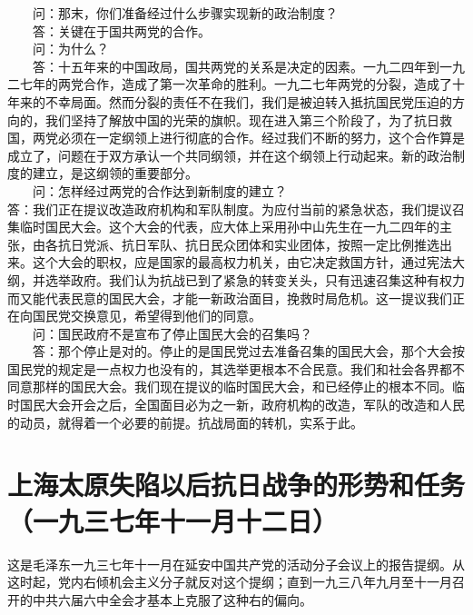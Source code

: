 \documentclass[cn,11pt,chinese]{elegantbook}
\def\myformat#1{\hfil\hfil #1}
\begin{document}
　　问：那末，你们准备经过什么步骤实现新的政治制度？\\
　　答：关键在于国共两党的合作。\\
　　问：为什么？\\
　　答：十五年来的中国政局，国共两党的关系是决定的因素。一九二四年到一九二七年的两党合作，造成了第一次革命的胜利。一九二七年两党的分裂，造成了十年来的不幸局面。然而分裂的责任不在我们，我们是被迫转入抵抗国民党压迫的方向的，我们坚持了解放中国的光荣的旗帜。现在进入第三个阶段了，为了抗日救国，两党必须在一定纲领上进行彻底的合作。经过我们不断的努力，这个合作算是成立了，问题在于双方承认一个共同纲领，并在这个纲领上行动起来。新的政治制度的建立，是这纲领的重要部分。\\
　　问：怎样经过两党的合作达到新制度的建立？\\
答：我们正在提议改造政府机构和军队制度。为应付当前的紧急状态，我们提议召集临时国民大会。这个大会的代表，应大体上采用孙中山先生在一九二四年的主张，由各抗日党派、抗日军队、抗日民众团体和实业团体，按照一定比例推选出来。这个大会的职权，应是国家的最高权力机关，由它决定救国方针，通过宪法大纲，并选举政府。我们认为抗战已到了紧急的转变关头，只有迅速召集这种有权力而又能代表民意的国民大会，才能一新政治面目，挽救时局危机。这一提议我们正在向国民党交换意见，希望得到他们的同意。\\
　　问：国民政府不是宣布了停止国民大会的召集吗？\\
　　答：那个停止是对的。停止的是国民党过去准备召集的国民大会，那个大会按国民党的规定是一点权力也没有的，其选举更根本不合民意。我们和社会各界都不同意那样的国民大会。我们现在提议的临时国民大会，和已经停止的根本不同。临时国民大会开会之后，全国面目必为之一新，政府机构的改造，军队的改造和人民的动员，就得着一个必要的前提。抗战局面的转机，实系于此。\\
\newpage\section*{\myformat{上海太原失陷以后抗日战争的形势和任务}\\\myformat{（一九三七年十一月十二日）}}
\begin{introduction}\item  这是毛泽东一九三七年十一月在延安中国共产党的活动分子会议上的报告提纲。从这时起，党内右倾机会主义分子就反对这个提纲；直到一九三八年九月至十一月召开的中共六届六中全会才基本上克服了这种右的偏向。\end{introduction}
\end{document}
